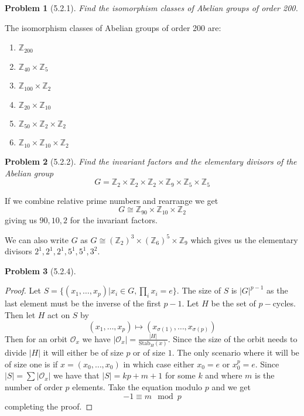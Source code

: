 \documentclass[10pt]{article}
\newcommand{\sk}{\vskip 10mm}
\newcommand{\bb}[1]{\mathbb{#1}}
\theoremstyle{plain}
\newtheorem{problem}{Problem}
\theoremstyle{remark}
\begin{document}
\begin{problem}[5.2.1]
  Find the isomorphism classes of Abelian groups of order 200.
\end{problem}

The isomorphism classes of Abelian groups of order 200 are:
\begin{enumerate}
\item $\bb{Z}_{200}$
\item $\bb{Z}_{40}\times\bb{Z}_{5}$
\item $\bb{Z}_{100}\times\bb{Z}_{2}$
\item $\bb{Z}_{20}\times\bb{Z}_{10}$
\item $\bb{Z}_{50}\times\bb{Z}_{2}\times\bb{Z}_{2}$
\item $\bb{Z}_{10}\times\bb{Z}_{10}\times\bb{Z}_{2}$
\end{enumerate}

\sk

\begin{problem}[5.2.2]
  Find the invariant factors and the elementary divisors of the Abelian
  group
  \[ G=\bb{Z}_2\times\bb{Z}_2\times\bb{Z}_2\times\bb{Z}_9\times\bb{Z}_5\times\bb{Z}_5\]
\end{problem}

If we combine relative prime numbers and rearrange we get
\[ G\cong \bb{Z}_{90}\times \bb{Z}_{10}\times \bb{Z}_2\]
giving us $90,10,2$ for the invariant factors.

We can also write $G$ as
$G\cong (\bb{Z}_2)^3\times(\bb{Z}_6)^5\times\bb{Z}_9$
which gives us the elementary divisors
$2^1,2^1,2^1,5^1,5^1,3^2$.

\sk

\begin{problem}[5.2.4]
  
\end{problem}

\begin{proof}
  Let $S=\{(x_1,\ldots,x_p)|x_i\in G,\prod_ix_i=e\}$. The size of $S$ is
  $|G|^{p-1}$ as the last element must be the inverse of the first
  $p-1$. Let $H$ be the set of $p-$cycles. Then let $H$ act on
  $S$ by
  \[ (x_1,\ldots,x_p)\mapsto(x_{\sigma(1)},\ldots,x_{\sigma(p)})\]
  Then for an orbit $\mathcal{O}_x$ we have
  $|\mathcal{O}_x|=\frac{|H|}{\text{Stab}_H(x)}$. Since the
  size of the orbit needs to divide $|H|$ it will
  either be of size $p$ or of size $1$. The only scenario where
  it will be of size one is if $x=(x_0,\ldots,x_0)$ in which
  case either $x_0=e$ or $x_0^p=e$. Since $|S|=\sum|\mathcal{O}_x|$
  we have that $|S|=kp+m+1$ for some $k$ and where $m$ is the number
  of order $p$ elements. Take the equation modulo
  $p$ and we get
  \[ -1 \equiv m\mod p\]
  completing the proof.
\end{proof}
\end{document}
